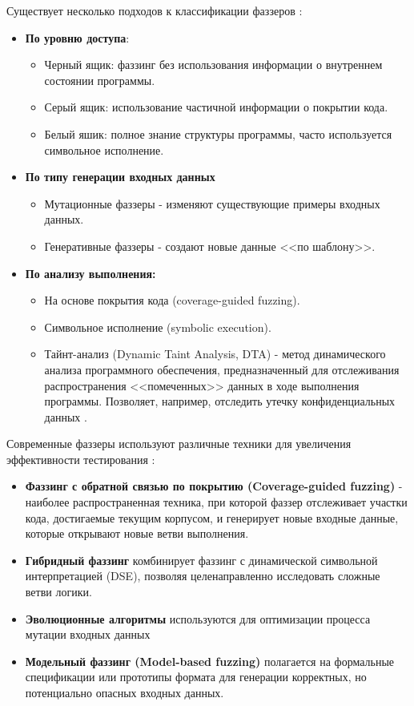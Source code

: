 Существует несколько подходов к классификации фаззеров \cite{Kuliamin}\cite{Boehme}:
\begin{itemize}
	\item \textbf{По уровню доступа}:
	\begin{itemize}
		\item Черный ящик: фаззинг без использования информации о внутреннем состоянии программы.
		\item Серый ящик: использование частичной информации о покрытии кода.
		\item Белый яшик: полное знание структуры программы, часто используется символьное исполнение.
	\end{itemize}
	\item \textbf{По типу генерации входных данных}
	\begin{itemize}
		\item Мутационные фаззеры - изменяют существующие примеры входных данных.
		\item Генеративные фаззеры - создают новые данные <<по шаблону>>.
	\end{itemize}
	\item \textbf{По анализу выполнения:}
	\begin{itemize}
		\item На основе покрытия кода (coverage-guided fuzzing).
		\item Символьное исполнение (symbolic execution).
		\item Тайнт-анализ (Dynamic Taint Analysis, DTA) - метод динамического анализа программного обеспечения, предназначенный для отслеживания распространения <<помеченных>> данных в ходе выполнения программы. Позволяет, например, отследить утечку конфиденциальных данных \cite{Kuliamin}.
	\end{itemize}
\end{itemize}

Современные фаззеры используют различные техники для увеличения эффективности тестирования \cite{Kuliamin}\cite{Boehme}:
\begin{itemize}
	\item \textbf{Фаззинг с обратной связью по покрытию (Coverage-guided fuzzing)} - наиболее распространенная техника, при которой фаззер отслеживает участки кода, достигаемые текущим корпусом, и генерирует новые входные данные, которые открывают новые ветви выполнения.
	\item \textbf{Гибридный фаззинг}  комбинирует фаззинг с динамической символьной интерпретацией (DSE), позволяя целенаправленно исследовать сложные ветви логики.
	\item \textbf{Эволюционные алгоритмы} используются для оптимизации процесса мутации входных данных
	\item \textbf{Модельный фаззинг (Model-based fuzzing)} полагается на формальные спецификации или прототипы формата для генерации корректных, но потенциально опасных входных данных.
\end{itemize}

